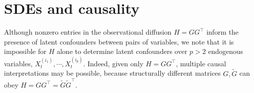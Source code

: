 \documentclass[twoside,11pt]{article}
\begin{document}
\section{SDEs and causality}
\label{sec: SDEs_causality}


Although nonzero entries in the observational diffusion $H = GG^\top$ inform the presence of latent confounders between pairs of variables, we note that it is impossible for $H$ alone to determine latent confounders over $p>2$ endogenous variables, $X_t^{(i_1)}, \cdots , X_t^{(i_p)}$.
Indeed, given only $H = GG^\top$, multiple causal interpretations may be possible, because structurally different matrices $G, \tilde{G}$ can obey $H = GG^\top = \tilde{G}\tilde{G}^\top$. 
\end{document}
